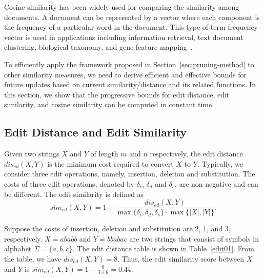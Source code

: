 Cosine similarity has been widely used for comparing the similarity among documents. A document can be represented by a vector where each component is the frequency of a particular word in the document. This type of term-frequency vector is used in applications including information retrieval, text document clustering, biological taxonomy, and gene feature mapping~\cite{HkP11}.        

To efficiently apply the framework proposed in Section~\ref{sec:pruning-method} to other similarity measures, we need to derive efficient and effective bounds for future updates based on current similarity/distance and its related functions. In this section, we show that the progressive bounds for edit distance, edit similarity, and cosine similarity can be computed in constant time.    

 
\subsection{Edit Distance and Edit Similarity}

\begin{definition}\label{def:edit-gen}
Given two strings $X$ and $Y$ of length $m$ and $n$ respectively, the edit distance $dis_{ed}(X, Y)$ is the minimum cost required to convert $X$ to $Y$. Typically, we consider three edit operations, namely, insertion, deletion and substitution. The costs of three edit operations, denoted by $\delta_i$, $\delta_d$ and $\delta_s$, are non-negative and can be different. The edit similarity is defined as $$sim_{ed}(X, Y) = 1 - \frac{dis_{ed}(X, Y)}{\max\{\delta_i, \delta_d, \delta_s\}\cdot \max\{|X|, |Y|\}}.$$
\end{definition}

\begin{example}\label{example:comp-edit}
Suppose the costs of insertion, deletion and substitution are 2, 1, and 3, respectively. $X = ababb$ and $Y = bbabac$ are two strings that consist of symbols in alphabet $\Sigma=\{a, b, c\}$. The edit distance table is shown in Table~\ref{edit01}. From the table, we have $dis_{ed}(X, Y) = 8$. Thus, the edit similarity score between $X$ and $Y$ is $sim_{ed}(X, Y) = 1- \frac{8}{3\times 6} = 0.44$.
\end{example}

